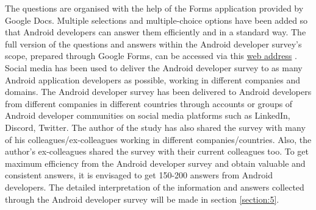 The questions are organised with the help of the Forms application provided by Google Docs. Multiple selections and multiple-choice options have been added so that Android developers can answer them efficiently and in a standard way. The full version of the questions and answers within the Android developer survey’s scope, prepared through Google Forms, can be accessed via this \href{https://forms.gle/hasQ8FNsMYtz1d1K9}{web address} . Social media has been used to deliver the Android developer survey to as many Android application developers as possible, working in different companies and domains. The Android developer survey has been delivered to Android developers from different companies in different countries through accounts or groups of Android developer communities on social media platforms such as LinkedIn, Discord, Twitter. The author of the study has also shared the survey with many of his colleagues/ex-colleagues working in different companies/countries. Also, the author's ex-colleagues shared the survey with their current colleagues too. To get maximum efficiency from the Android developer survey and obtain valuable and consistent answers, it is envisaged to get 150-200 answers from Android developers. The detailed interpretation of the information and answers collected through the Android developer survey will be made in section \ref{section:5}.